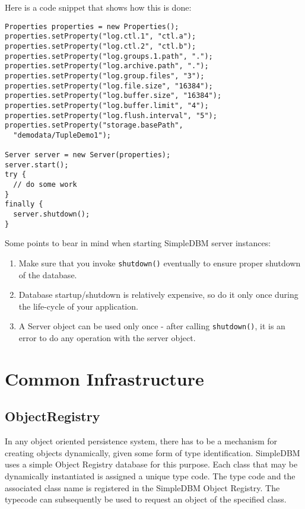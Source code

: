\documentclass[a4paper,draft,oneside]{book}
\begin{document}
Here is a code snippet that shows how this is done:

\begin{verbatim}
Properties properties = new Properties();
properties.setProperty("log.ctl.1", "ctl.a");
properties.setProperty("log.ctl.2", "ctl.b");
properties.setProperty("log.groups.1.path", ".");
properties.setProperty("log.archive.path", ".");
properties.setProperty("log.group.files", "3");
properties.setProperty("log.file.size", "16384");
properties.setProperty("log.buffer.size", "16384");
properties.setProperty("log.buffer.limit", "4");
properties.setProperty("log.flush.interval", "5");
properties.setProperty("storage.basePath", 
  "demodata/TupleDemo1");

Server server = new Server(properties);
server.start();
try {
  // do some work
}
finally {
  server.shutdown();
}
\end{verbatim}

Some points to bear in mind when starting SimpleDBM server instances:

\begin{enumerate}
\item Make sure that you invoke \verb|shutdown()| eventually to ensure proper
  shutdown of the database.
\item Database startup/shutdown is relatively expensive, so do it only
  once during the life-cycle of your application.
\item A Server object can be used only once - after calling
  \verb|shutdown()|, it is an error to do any operation with the server
  object.
\end{enumerate}

\chapter{Common Infrastructure}

\section{ObjectRegistry}
In any object oriented persistence system, there has to be a mechanism
for creating objects dynamically, given some form of type
identification. SimpleDBM uses a simple Object Registry database for
this purpose. Each class that may be dynamically instantiated is
assigned a unique type code. The type code and the associated class
name is registered in the SimpleDBM Object Registry. The typecode can
subsequently be used to request an object of the specified class.
\end{document}
